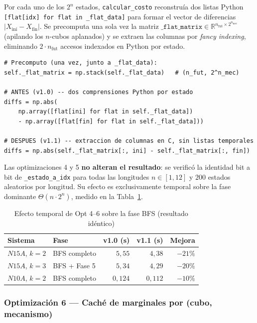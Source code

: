 \documentclass[12pt,letterpaper]{article}
\theoremstyle{definition}
\theoremstyle{remark}
\newcommand{\BigTheta}[1]{\Theta(#1)}
\begin{document}
Por cada uno de los $2^n$ estados, \texttt{calcular\_costo} reconstruía dos listas
Python \texttt{[flat[idx] for flat in \_flat\_data]} para formar el vector de diferencias
$|X_{\mathrm{ini}} - X_{\mathrm{fin}}|$. Se precomputa una sola vez la matriz
$\texttt{\_flat\_matrix} \in \mathbb{R}^{n_{\mathrm{fut}} \times 2^{n_{\mathrm{mec}}}}$
(apilando los $n$-cubos aplanados) y se extraen las columnas por \emph{fancy indexing},
eliminando $2 \cdot n_{\mathrm{fut}}$ accesos indexados en Python por estado.

\begin{lstlisting}[style=python,
  caption={Opt 5: diferencias por columnas vectorizadas},label=lst:opt5]
# Precomputo (una vez, junto a _flat_data):
self._flat_matrix = np.stack(self._flat_data)   # (n_fut, 2^n_mec)

# ANTES (v1.0) -- dos comprensiones Python por estado
diffs = np.abs(
    np.array([flat[ini] for flat in self._flat_data])
    - np.array([flat[fin] for flat in self._flat_data]))

# DESPUES (v1.1) -- extraccion de columnas en C, sin listas temporales
diffs = np.abs(self._flat_matrix[:, ini] - self._flat_matrix[:, fin])
\end{lstlisting}

Las optimizaciones 4 y 5 \textbf{no alteran el resultado}: se verificó la identidad
bit a bit de \texttt{\_estado\_a\_idx} para todas las longitudes $n \in [1,12]$ y
$200$ estados aleatorios por longitud. Su efecto es exclusivamente temporal sobre la
fase dominante $\BigTheta{n \cdot 2^n}$, medido en la Tabla~\ref{tab:opt-tiempos}.

\begin{table}[ht]
\centering
\caption{Efecto temporal de Opt 4--6 sobre la fase BFS (resultado idéntico)}
\label{tab:opt-tiempos}
\begin{tabular}{@{}l l r r r@{}}
\toprule
\textbf{Sistema} & \textbf{Fase} & \textbf{v1.0 (s)} & \textbf{v1.1 (s)} & \textbf{Mejora} \\
\midrule
$N15A$, $k=2$ & BFS completo & $5{,}55$ & $4{,}38$ & $-21\%$ \\
$N15A$, $k=3$ & BFS + Fase 5 & $5{,}34$ & $4{,}29$ & $-20\%$ \\
$N10A$, $k=2$ & BFS completo & $0{,}124$ & $0{,}112$ & $-10\%$ \\
\bottomrule
\end{tabular}
\end{table}

\subsubsection{Optimización 6 --- Caché de marginales por (cubo, mecanismo)}
\end{document}
